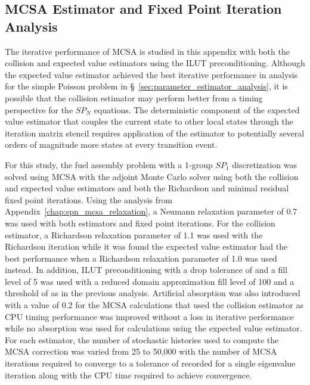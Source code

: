 \subsection{MCSA Estimator and Fixed Point Iteration Analysis}
\label{subsec:spn_estimator_comparison}
The iterative performance of MCSA is studied in this appendix with
both the collision and expected value estimators using the ILUT
preconditioning. Although the expected value estimator achieved the
best iterative performance in analysis for the simple Poisson problem
in \S~\ref{sec:parameter_estimator_analysis}, it is possible that the
collision estimator may perform better from a timing perspective for
the $SP_N$ equations. The deterministic component of the expected
value estimator that couples the current state to other local states
through the iteration matrix stencil requires application of the
estimator to potentially several orders of magnitude more states at
every transition event.

For this study, the fuel assembly problem with a 1-group $SP_1$
discretization was solved using MCSA with the adjoint Monte Carlo
solver using both the collision and expected value estimators and both
the Richardson and minimal residual fixed point iterations. Using the
analysis from Appendix~\ref{chap:spn_mcsa_relaxation}, a Neumann
relaxation parameter of 0.7 was used with both estimators and fixed
point iterations. For the collision estimator, a Richardson relaxation
parameter of 1.1 was used with the Richardson iteration while it was
found the expected value estimator had the best performance when a
Richardson relaxation parameter of 1.0 was used instead. In addition,
ILUT preconditioning with a drop tolerance of  and a fill
level of 5 was used with a reduced domain approximation fill level of
100 and a threshold of  as in the previous
analysis. Artificial absorption was also introduced with a value of
0.2 for the MCSA calculations that used the collision estimator as CPU
timing performance was improved without a loss in iterative
performance while no absorption was used for calculations using the
expected value estimator. For each estimator, the number of stochastic
histories used to compute the MCSA correction was varied from 25 to
50,000 with the number of MCSA iterations required to converge to a
tolerance of  recorded for a single eigenvalue iteration
along with the CPU time required to achieve convergence.

